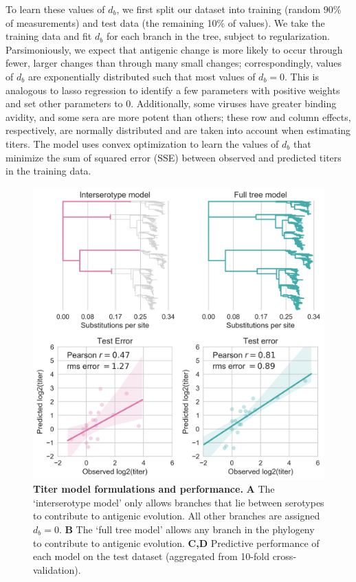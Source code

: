 \documentclass[11pt,oneside,letterpaper]{article}
\begin{document}
To learn these values of $d_b$, we first split our dataset into training (random 90\% of measurements) and test data (the remaining 10\% of values).
We take the training data and fit $d_b$ for each branch in the tree, subject to regularization.
Parsimoniously, we expect that antigenic change is more likely to occur through fewer, larger changes than through many small changes; correspondingly, values of $d_b$ are exponentially distributed such that most values of $d_b = 0$.
This is analogous to lasso regression to identify a few parameters with positive weights and set other parameters to 0.
Additionally, some viruses have greater binding avidity, and some sera are more potent than others; these row and column effects, respectively, are normally distributed and are taken into account when estimating titers.
The model uses convex optimization to learn the values of $d_b$ that minimize the sum of squared error (SSE) between observed and predicted titers in the training data.

\begin{figure}[h]
  \begin{centering}
    \includegraphics[width=.8\textwidth]{../figures/png/titer_model_performance.png}
        \caption{\textbf{Titer model formulations and performance.}  \textbf{A} The `interserotype model' only allows branches that lie between serotypes to contribute to antigenic evolution. All other branches are assigned $d_b = 0$. \textbf{B} The `full tree model' allows any branch in the phylogeny to contribute to antigenic evolution. \textbf{C,D} Predictive performance of each model on the test dataset (aggregated from 10-fold cross-validation).}
         \label{titer_model_performance}
  \end{centering}
\end{figure}
\end{document}
